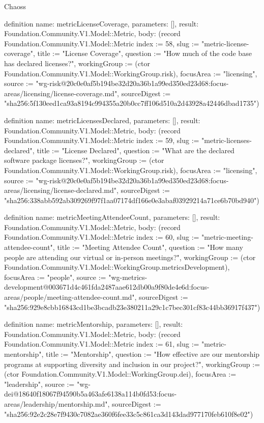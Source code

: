 \begin{lexlean}{Chaoss}
\begin{semanticmodule}
definition{
  name: metricLicenseCoverage,
  parameters: [],
  result: Foundation.Community.V1.Model::Metric,
  body: (record Foundation.Community.V1.Model::Metric {index := 58, slug := "metric-license-coverage", title := "License Coverage", question := "How much of the code base has declared licenses?", workingGroup := (ctor Foundation.Community.V1.Model::WorkingGroup.risk), focusArea := "licensing", source := "wg-risk@20c0e0af5b194be32d20a36b1a99ed350ed23d68:focus-areas/licensing/license-coverage.md", sourceDigest := "sha256:5f130eed1ca93a8194c994355a20b0cc7ff106d510a2d43928a42446dbad1735"})
}

definition{
  name: metricLicensesDeclared,
  parameters: [],
  result: Foundation.Community.V1.Model::Metric,
  body: (record Foundation.Community.V1.Model::Metric {index := 59, slug := "metric-licenses-declared", title := "License Declared", question := "What are the declared software package licenses?", workingGroup := (ctor Foundation.Community.V1.Model::WorkingGroup.risk), focusArea := "licensing", source := "wg-risk@20c0e0af5b194be32d20a36b1a99ed350ed23d68:focus-areas/licensing/license-declared.md", sourceDigest := "sha256:338abb592ab309269f97f1aa07174df166e0e3abaf03929214a71ce6b70bd940"})
}

definition{
  name: metricMeetingAttendeeCount,
  parameters: [],
  result: Foundation.Community.V1.Model::Metric,
  body: (record Foundation.Community.V1.Model::Metric {index := 60, slug := "metric-meeting-attendee-count", title := "Meeting Attendee Count", question := "How many people are attending our virtual or in-person meetings?", workingGroup := (ctor Foundation.Community.V1.Model::WorkingGroup.metricsDevelopment), focusArea := "people", source := "wg-metrics-development@003671d4c461fda2487aae612db00a9f80de4e6d:focus-areas/people/meeting-attendee-count.md", sourceDigest := "sha256:929e8cbb16843cd1be3bcadb23e380211a29c1c7bec301cf83c44bb36917f437"})
}

definition{
  name: metricMentorship,
  parameters: [],
  result: Foundation.Community.V1.Model::Metric,
  body: (record Foundation.Community.V1.Model::Metric {index := 61, slug := "metric-mentorship", title := "Mentorship", question := "How effective are our mentorship programs at supporting diversity and inclusion in our project?", workingGroup := (ctor Foundation.Community.V1.Model::WorkingGroup.dei), focusArea := "leadership", source := "wg-dei@18640f18067f94590b5a463afe6138a114b0fd53:focus-areas/leadership/mentorship.md", sourceDigest := "sha256:92e2c28e7f9430c7082ae360f6fee33c5c861ca3d143dad977170feb610f8e02"})
}


\end{semanticmodule}
\end{lexlean}
